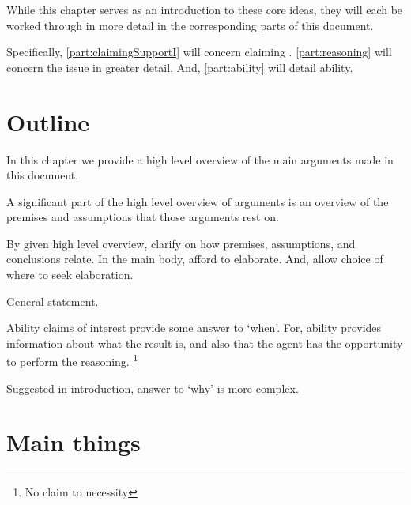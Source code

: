 \begin{note}
  While this chapter serves as an introduction to these core ideas, they will each be worked through in more detail in the corresponding parts of this document.

  Specifically, \autoref{part:claimingSupportI} will concern claiming \support{}.
  \autoref{part:reasoning} will concern the issue in greater detail.
  And, \autoref{part:ability} will detail ability.
\end{note}

\section{Outline}
\label{sec:outline}

\begin{note}
  In this chapter we provide a high level overview of the main arguments made in this document.

  A significant part of the high level overview of arguments is an overview of the premises and assumptions that those arguments rest on.

  By given high level overview, clarify on how premises, assumptions, and conclusions relate.
  In the main body, afford to elaborate.
  And, allow choice of where to seek elaboration.
\end{note}

\begin{note}
  General statement.
  



  Ability claims of interest provide some answer to `when'.
  For, ability provides information about what the result is, and also that the agent has the opportunity to perform the reasoning.\nolinebreak
  \footnote{No claim to necessity}

  Suggested in introduction, answer to `why' is more complex.
\end{note}

\section{Main things}
\label{sec:main-things}

